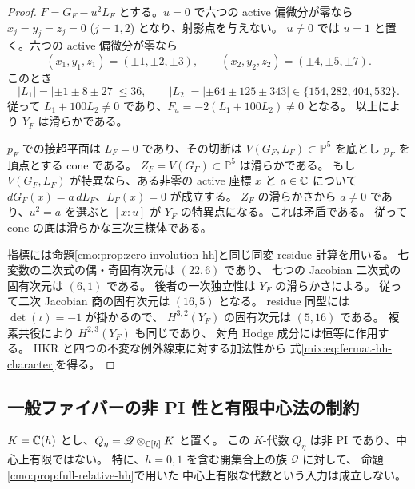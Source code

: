 \begin{proof}
$F=G_F-u^2L_F$ とする。$u=0$ で六つの active 偏微分が零なら
$x_j=y_j=z_j=0$ ($j=1,2$) となり、射影点を与えない。
$u\ne0$ では $u=1$ と置く。六つの active 偏微分が零なら
\[
 (x_1,y_1,z_1)=(\pm1,\pm2,\pm3),\qquad
 (x_2,y_2,z_2)=(\pm4,\pm5,\pm7).
\]
このとき
\[
 |L_1|=|\pm1\pm8\pm27|\le36,\qquad
 |L_2|=|\pm64\pm125\pm343|
        \in\{154,282,404,532\}.
\]
従って $L_1+100L_2\ne0$ であり、$F_u=-2(L_1+100L_2)\ne0$ となる。
以上により $Y_F$ は滑らかである。

$p_F$ での接超平面は $L_F=0$ であり、その切断は
$V(G_F,L_F)\subset\mathbb P^5$ を底とし $p_F$ を頂点とする cone である。
$Z_F=V(G_F)\subset\mathbb P^5$ は滑らかである。
もし $V(G_F,L_F)$ が特異なら、ある非零の active 座標 $x$ と
$a\in\mathbb C$ について $dG_F(x)=a\,dL_F$、$L_F(x)=0$ が成立する。
$Z_F$ の滑らかさから $a\ne0$ であり、$u^2=a$ を選ぶと
$[x:u]$ が $Y_F$ の特異点になる。これは矛盾である。
従って cone の底は滑らかな三次三様体である。

指標には命題\ref{cmo:prop:zero-involution-hh}と同じ同変 residue 計算を用いる。
七変数の二次式の偶・奇固有次元は $(22,6)$ であり、
七つの Jacobian 二次式の固有次元は $(6,1)$ である。
後者の一次独立性は $Y_F$ の滑らかさによる。
従って二次 Jacobian 商の固有次元は $(16,5)$ となる。
residue 同型には $\det(\iota)=-1$ が掛かるので、
$H^{3,2}(Y_F)$ の固有次元は $(5,16)$ である。
複素共役により $H^{2,3}(Y_F)$ も同じであり、
対角 Hodge 成分には恒等に作用する。
HKR と四つの不変な例外線束に対する加法性から
式\eqref{mix:eq:fermat-hh-character}を得る。
\end{proof}

\subsection{一般ファイバーの非 PI 性と有限中心法の制約}

\begin{proposition}[一般の交換子パラメータでは非 PI]
\label{mix:prop:h-generic-nonpi}
$K=\mathbb C(h)$ とし、$Q_\eta=\mathscr Q\otimes_{\mathbb C[h]}K$ と置く。
この $K$-代数 $Q_\eta$ は非 PI であり、中心上有限ではない。
特に、$h=0,1$ を含む開集合上の族 $\mathscr Q$ に対して、
命題\ref{cmo:prop:full-relative-hh}で用いた
中心上有限な代数という入力は成立しない。
\end{proposition}

